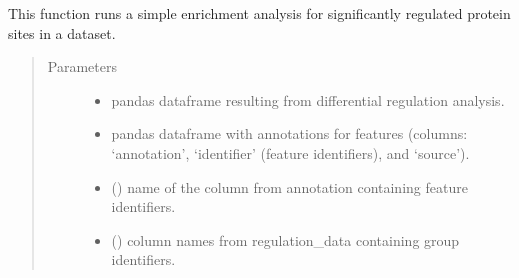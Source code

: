 \documentclass[letterpaper,10pt,english]{sphinxmanual}
\begin{document}
\begin{fulllineitems}
\label{\detokenize{_autosummary/analytics_core.analytics:analytics_core.analytics.analytics.run_site_regulation_enrichment}}
This function runs a simple enrichment analysis for significantly regulated protein sites in a dataset.
\begin{quote}\begin{description}
\item[{Parameters}] \leavevmode\begin{itemize}
\item {} 
 \textendash{} pandas dataframe resulting from differential regulation analysis.

\item {} 
 \textendash{} pandas dataframe with annotations for features (columns: ‘annotation’, ‘identifier’ (feature identifiers), and ‘source’).

\item {} 
 () \textendash{} name of the column from annotation containing feature identifiers.

\item {} 
 () \textendash{} column names from regulation\_data containing group identifiers.


\end{itemize}
\end{description}
\end{quote}
\end{fulllineitems}
\end{document}
